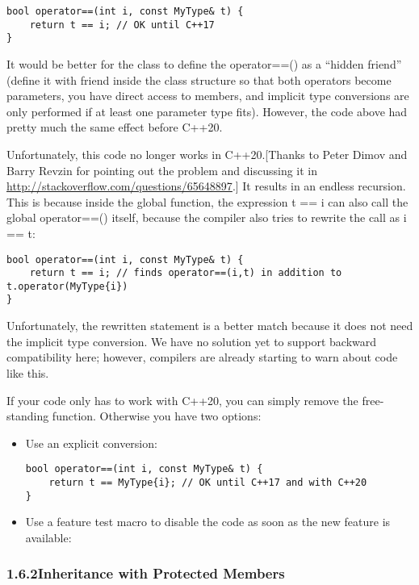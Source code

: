 \begin{lstlisting}[style=styleCXX]
bool operator==(int i, const MyType& t) {
	return t == i; // OK until C++17
}
\end{lstlisting}

It would be better for the class to define the operator==() as a “hidden friend” (define it with friend inside the class structure so that both operators become parameters, you have direct access to members, and implicit type conversions are only performed if at least one parameter type fits). However, the code above had pretty much the same effect before C++20.

Unfortunately, this code no longer works in C++20.[Thanks to Peter Dimov and Barry Revzin for pointing out the problem and discussing it in \url{http://stackoverflow.com/questions/65648897}.] It results in an endless recursion. This is because inside the global function, the expression t == i can also call the global operator==() itself, because the compiler also tries to rewrite the call as i == t:

\begin{lstlisting}[style=styleCXX]
bool operator==(int i, const MyType& t) {
	return t == i; // finds operator==(i,t) in addition to t.operator(MyType{i})
}
\end{lstlisting}

Unfortunately, the rewritten statement is a better match because it does not need the implicit type conversion. We have no solution yet to support backward compatibility here; however, compilers are already starting to warn about code like this.

If your code only has to work with C++20, you can simply remove the free-standing function. Otherwise you have two options:

\begin{itemize}
\item
Use an explicit conversion:

\begin{lstlisting}[style=styleCXX]
bool operator==(int i, const MyType& t) {
	return t == MyType{i}; // OK until C++17 and with C++20
}
\end{lstlisting}

\item
Use a feature test macro to disable the code as soon as the new feature is available:
\end{itemize}

\subsubsection*{ 1.6.2\hspace{0.2cm}Inheritance with Protected Members}

